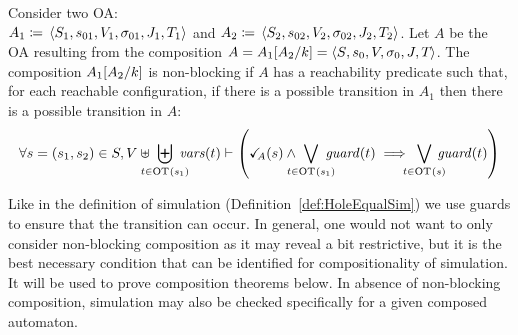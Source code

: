 \documentclass[runningheads]{llncs}
\begin{document}
%
\begin{definition} \label{Def:Non-block}
Consider two OA:\\ \(A_1 \defobject \OAg[1]\) and \( A_2 \defobject \OAg[2]\).
Let $A$ be the OA resulting from the composition \(A = A_1{\left[A_2\middle/k\right]}= \left<S_{},s_{0},V_{},\sigma_{0},J_{},T_{}\right>\). 
The composition \(A_1{\left[A_2\middle/k\right]}\) is non-blocking if   \(A \) has a reachability predicate such that, for each reachable configuration, if there is a possible transition in \(A_1\) then there is a possible transition in \(A\):
\[ \forall s = \mpar{s_1, s_2} \in S, V \uplus \biguplus_\subbox{t \in \fOT{s_1}} \fvars{t} \vdash  \left(\reach{A}\mpar{s} \wedge \bigvee_\subbox{t \in \fOT{s_1}} \fguard{t} \implies \bigvee_\subbox{t \in \fOT{s}} \fguard{t} \right)
\]
\end{definition}
Like in the definition of simulation (Definition~\ref{def:HoleEqualSim}) we use guards to ensure that the transition can occur. 
In general, one would not want to only consider non-blocking composition as it may reveal a bit restrictive, but it is the best necessary condition that can be identified for compositionality of simulation. It will be used to prove composition theorems below. 
In absence of non-blocking composition, simulation may also be checked specifically for a given composed automaton.
\end{document}
